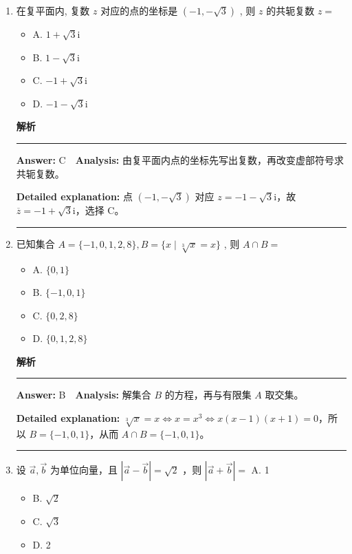 \documentclass[UTF8,12pt,a4paper]{ctexart}
\renewcommand{\labelenumi}{\arabic{enumi}.}
\newenvironment{examSolutionBox}{%
  \par\medskip\begingroup
  \setlength{\leftskip}{1.0em}\setlength{\rightskip}{0.9em}%
  \noindent\textcolor{SolutionTeal}{\bfseries\large 解析}\par
  \smallskip\noindent\textcolor{SolutionRule}{\rule{\dimexpr\linewidth-\leftskip-\rightskip\relax}{0.8pt}}\par
  \smallskip\color{SolutionInk}%
}{%
  \par\smallskip\noindent\textcolor{SolutionRule}{\rule{\dimexpr\linewidth-\leftskip-\rightskip\relax}{0.8pt}}\par
  \endgroup\medskip
}
\providecommand{\tightlist}{%
  \setlength{\itemsep}{0pt}\setlength{\parskip}{0pt}}
\begin{document}
\begin{enumerate}
\def\labelenumi{\arabic{enumi}.}
\item
  在复平面内, 复数 \(z\) 对应的点的坐标是 \((-1, -\sqrt{3})\) , 则 \(z\) 的共轭复数 \(z =\)

  \begin{itemize}
  \tightlist
  \item
    A. \(1 + \sqrt{3}\mathrm{i}\)
  \item
    B. \(1 - \sqrt{3}\mathrm{i}\)
  \item
    C. \(-1 + \sqrt{3}\mathrm{i}\)
  \item
    D. \(-1 - \sqrt{3}\mathrm{i}\)
  \end{itemize}

  \begin{examSolutionBox}

  \textbf{Answer:} C　\textbf{Analysis:} 由复平面内点的坐标先写出复数，再改变虚部符号求共轭复数。

  \textbf{Detailed explanation:} 点 \((-1,-\sqrt3)\) 对应 \(z=-1-\sqrt3\mathrm i\)，故 \(\overline z=-1+\sqrt3\mathrm i\)，选择 C。

  \end{examSolutionBox}
\item
  已知集合 \(A = \{-1, 0, 1, 2, 8\}, B = \{x \mid \sqrt[3]{x} = x\}\) , 则 \(A \cap B =\)

  \begin{itemize}
  \tightlist
  \item
    A. \(\{0, 1\}\)
  \item
    B. \(\{-1, 0, 1\}\)
  \item
    C. \(\{0, 2, 8\}\)
  \item
    D. \(\{0, 1, 2, 8\}\)
  \end{itemize}

  \begin{examSolutionBox}

  \textbf{Answer:} B　\textbf{Analysis:} 解集合 \(B\) 的方程，再与有限集 \(A\) 取交集。

  \textbf{Detailed explanation:} \(\sqrt[3]x=x\iff x=x^3\iff x(x-1)(x+1)=0\)，所以 \(B=\{-1,0,1\}\)，从而 \(A\cap B=\{-1,0,1\}\)。

  \end{examSolutionBox}
\item
  设 \(\vec{a}, \vec{b}\) 为单位向量，且 \(|\vec{a} - \vec{b}| = \sqrt{2}\) ，则 \(|\vec{a} + \vec{b}| =\) A. 1

  \begin{itemize}
  \tightlist
  \item
    B. \(\sqrt{2}\)
  \item
    C. \(\sqrt{3}\)
  \item
    D. 2
  \end{itemize}


\end{enumerate}
\end{document}
